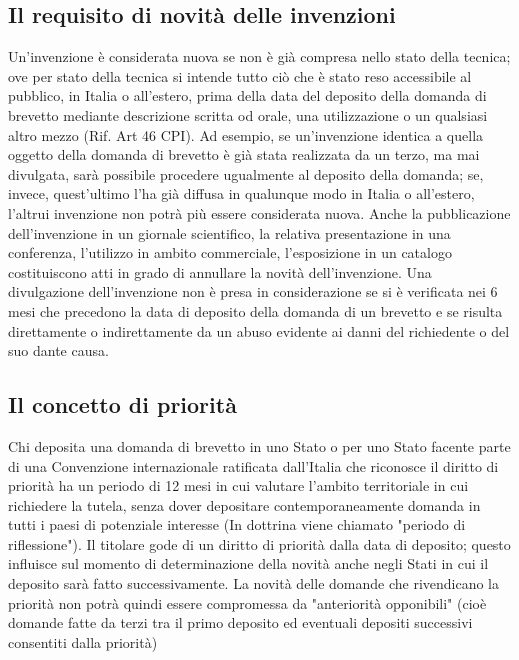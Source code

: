 \subsection{Il requisito di novità delle invenzioni}
Un'invenzione è considerata nuova se non è già compresa nello stato della tecnica; ove per stato della tecnica si intende tutto ciò che è stato reso accessibile al pubblico, in Italia o all'estero, prima della data del deposito della domanda di brevetto mediante descrizione scritta od orale, una utilizzazione o un qualsiasi altro mezzo (Rif. Art 46 CPI). Ad esempio, se un'invenzione identica a quella oggetto della domanda di brevetto è già stata realizzata da un terzo, ma mai divulgata, sarà possibile procedere ugualmente al deposito della domanda; se, invece, quest'ultimo l'ha già diffusa in qualunque modo in Italia o all'estero, l'altrui invenzione non potrà più essere considerata nuova. Anche la pubblicazione dell'invenzione in un giornale scientifico, la relativa presentazione in una conferenza, l'utilizzo in ambito commerciale, l'esposizione in un catalogo costituiscono atti in grado di annullare la novità dell'invenzione.
\newline Una divulgazione dell'invenzione non è presa in considerazione se si è verificata nei 6 mesi che precedono
la data di deposito della domanda di un brevetto e se risulta direttamente o indirettamente da un abuso evidente ai danni del richiedente
o del suo dante causa.

\subsection{Il concetto di priorità}
Chi deposita una domanda di brevetto in uno Stato o per uno Stato facente parte di una Convenzione internazionale ratificata dall'Italia che riconosce
il diritto di priorità ha un periodo di 12 mesi in cui valutare l'ambito territoriale in cui richiedere la tutela, senza dover depositare contemporaneamente
domanda in tutti i paesi di potenziale interesse (In dottrina viene chiamato "periodo di riflessione").\newline
Il titolare gode di un diritto di priorità dalla data di deposito; questo influisce sul momento di determinazione della novità anche negli Stati in cui il deposito
sarà fatto successivamente.\newline
La novità delle domande che rivendicano la priorità non potrà quindi essere compromessa da "anteriorità opponibili" (cioè domande fatte da terzi tra il primo
deposito ed eventuali depositi successivi consentiti dalla priorità)

